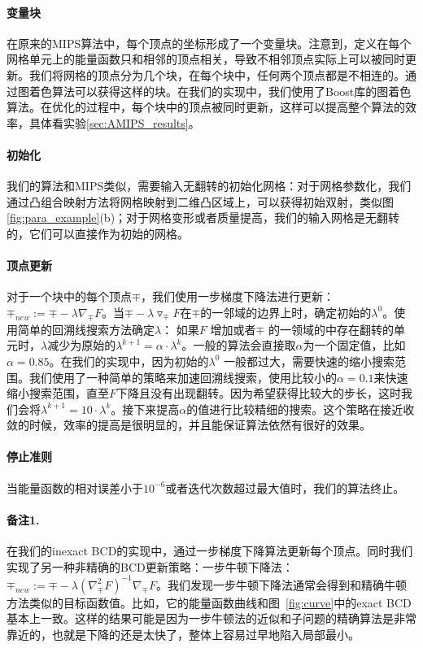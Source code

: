 \paragraph{变量块}
在原来的MIPS算法中，每个顶点的坐标形成了一个变量块。注意到，定义在每个网格单元上的能量函数只和相邻的顶点相关，导致不相邻顶点实际上可以被同时更新。我们将网格的顶点分为几个块，在每个块中，任何两个顶点都是不相连的。通过图着色算法可以获得这样的块。在我们的实现中，我们使用了Boost库的图着色算法。在优化的过程中，每个块中的顶点被同时更新，这样可以提高整个算法的效率，具体看实验\ref{sec:AMIPS_results}。

\paragraph{初始化}
我们的算法和MIPS类似，需要输入无翻转的初始化网格：对于网格参数化，我们通过凸组合映射方法将网格映射到二维凸区域上，可以获得初始双射，类似图\ref{fig:para_example}(b)；对于网格变形或者质量提高，我们的输入网格是无翻转的，它们可以直接作为初始的网格。

\paragraph{顶点更新}
对于一个块中的每个顶点$\mp$，我们使用一步梯度下降法进行更新： $\mp_{new} := \mp - \lambda \nabla_\mp F$。当$\mp - \lambda \triangledown_\mp F$在$\mp$的一邻域的边界上时，确定初始的$\lambda^0$。使用简单的回溯线搜索方法确定$\lambda$： 如果$F$ 增加或者$\mp$ 的一领域的中存在翻转的单元时，$\lambda$减少为原始的$\lambda^{k+1} = \alpha \cdot \lambda^{k}$。一般的算法会直接取$\alpha$为一个固定值，比如$\alpha=0.85$。在我们的实现中，因为初始的$\lambda^0$ 一般都过大，需要快速的缩小搜索范围。我们使用了一种简单的策略来加速回溯线搜索，使用比较小的$\alpha=0.1$来快速缩小搜索范围，直至$F$下降且没有出现翻转。因为希望获得比较大的步长，这时我们会将$\lambda^{k+1} = 10 \cdot \lambda^{k}$。接下来提高$\alpha$的值进行比较精细的搜索。这个策略在接近收敛的时候，效率的提高是很明显的，并且能保证算法依然有很好的效果。

\paragraph{停止准则}
当能量函数的相对误差小于$10^{-6}$或者迭代次数超过最大值时，我们的算法终止。

\paragraph{备注1.}
在我们的inexact BCD的实现中，通过一步梯度下降算法更新每个顶点。同时我们实现了另一种非精确的BCD更新策略：一步牛顿下降法：$\mp_{new} := \mp- \lambda (\nabla^2_\mp F)^{-1} \nabla_\mp F $。我们发现一步牛顿下降法通常会得到和精确牛顿方法类似的目标函数值。比如，它的能量函数曲线和图~\ref{fig:curve}中的exact BCD基本上一致。这样的结果可能是因为一步牛顿法的近似和子问题的精确算法是非常靠近的，也就是下降的还是太快了，整体上容易过早地陷入局部最小。

